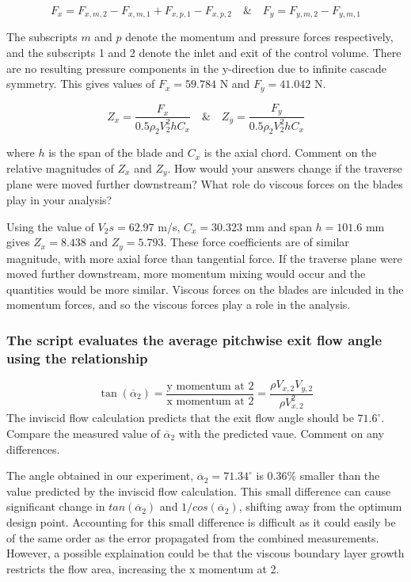 \documentclass{article}
\begin{document}
\begin{equation}
    F_x =  F_{x,m,2} - F_{x,m,1} + F_{x,p,1} - F_{x,p,2} \quad \& \quad F_y =  F_{y,m,2} - F_{y,m,1}
\end{equation}

The subscripts $m$ and $p$ denote the momentum and pressure forces respectively, and the subscripts 1 and 2 denote the inlet and exit of the control volume.
There are no resulting pressure components in the y-direction due to infinite cascade symmetry.
This gives values of $F_x = 59.784$ N and $F_y = 41.042$ N.

\begin{equation}
    Z_x = \frac{F_x}{0.5 \rho_2 V_2^2 h C_x} \quad \& \quad Z_y = \frac{F_y}{0.5 \rho_2 V_2^2 h C_x}
\end{equation}

where $h$ is the span of the blade and $C_x$ is the axial chord. Comment on the relative magnitudes
of $Z_x$ and $Z_y$. How would your answers change if the traverse plane were moved further
downstream? What role do viscous forces on the blades play in your analysis?

Using the value of $V_2s = 62.97$ m/s, $C_x = 30.323$ mm and span $h=101.6$ mm gives $Z_x = 8.438$ and $Z_y = 5.793$.
These force coefficients are of similar magnitude, with more axial force than tangential force.
If the traverse plane were moved further downstream, more momentum mixing would occur and the quantities would be more similar.
Viscous forces on the blades are inlcuded in the momentum forces, and so the viscous forces play a role in the analysis.

\subsubsection{The script evaluates the average pitchwise exit flow angle using the relationship
}
\begin{equation}
    \tan (\overline{\alpha}_2) = \frac{\text{y momentum at 2}}{\text{x momentum at 2}} = \frac{\rho V_{x,2}V_{y,2}}{\rho V_{x,2}^2} \label{eq:alpha2}
\end{equation}
The inviscid flow calculation predicts that the exit flow angle should be $71.6^\circ$. Compare the
measured value of $\overline{\alpha}_2$ with the predicted vaue. Comment on any differences.

The angle obtained in our experiment, $\overline{\alpha}_2 = 71.34^\circ$ is 0.36\% smaller than the value predicted by the inviscid flow calculation.
This small difference can cause significant change in $tan(\overline{\alpha}_2)$ and $1/cos(\overline{\alpha}_2)$, shifting away from the optimum design point.
Accounting for this small difference is difficult as it could easily be of the same order as the error propagated from the combined measurements.
However, a possible explaination could be that the viscous boundary layer growth restricts the flow area, increasing the x momentum at 2.
\end{document}
